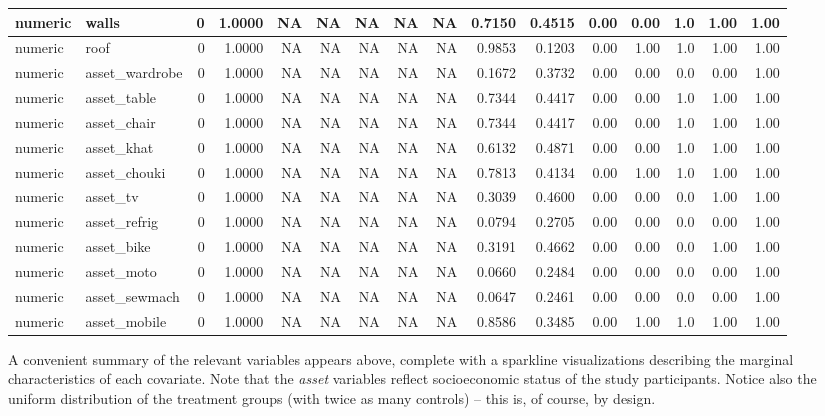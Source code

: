 \documentclass[
  12pt, krantz2,
]{krantz}
\newcommand{\1}{\mathbbm{1}}
\theoremstyle{definition}
\theoremstyle{definition}
\theoremstyle{definition}
\theoremstyle{definition}
\theoremstyle{remark}
\begin{document}
\begin{tabular}{l|l|r|r|r|r|r|r|r|r|r|r|r|r|r|r}
\hline
numeric & walls & 0 & 1.0000 & NA & NA & NA & NA & NA & 0.7150 & 0.4515 & 0.00 & 0.00 & 1.0 & 1.00 & 1.00\\
\hline
numeric & roof & 0 & 1.0000 & NA & NA & NA & NA & NA & 0.9853 & 0.1203 & 0.00 & 1.00 & 1.0 & 1.00 & 1.00\\
\hline
numeric & asset\_wardrobe & 0 & 1.0000 & NA & NA & NA & NA & NA & 0.1672 & 0.3732 & 0.00 & 0.00 & 0.0 & 0.00 & 1.00\\
\hline
numeric & asset\_table & 0 & 1.0000 & NA & NA & NA & NA & NA & 0.7344 & 0.4417 & 0.00 & 0.00 & 1.0 & 1.00 & 1.00\\
\hline
numeric & asset\_chair & 0 & 1.0000 & NA & NA & NA & NA & NA & 0.7344 & 0.4417 & 0.00 & 0.00 & 1.0 & 1.00 & 1.00\\
\hline
numeric & asset\_khat & 0 & 1.0000 & NA & NA & NA & NA & NA & 0.6132 & 0.4871 & 0.00 & 0.00 & 1.0 & 1.00 & 1.00\\
\hline
numeric & asset\_chouki & 0 & 1.0000 & NA & NA & NA & NA & NA & 0.7813 & 0.4134 & 0.00 & 1.00 & 1.0 & 1.00 & 1.00\\
\hline
numeric & asset\_tv & 0 & 1.0000 & NA & NA & NA & NA & NA & 0.3039 & 0.4600 & 0.00 & 0.00 & 0.0 & 1.00 & 1.00\\
\hline
numeric & asset\_refrig & 0 & 1.0000 & NA & NA & NA & NA & NA & 0.0794 & 0.2705 & 0.00 & 0.00 & 0.0 & 0.00 & 1.00\\
\hline
numeric & asset\_bike & 0 & 1.0000 & NA & NA & NA & NA & NA & 0.3191 & 0.4662 & 0.00 & 0.00 & 0.0 & 1.00 & 1.00\\
\hline
numeric & asset\_moto & 0 & 1.0000 & NA & NA & NA & NA & NA & 0.0660 & 0.2484 & 0.00 & 0.00 & 0.0 & 0.00 & 1.00\\
\hline
numeric & asset\_sewmach & 0 & 1.0000 & NA & NA & NA & NA & NA & 0.0647 & 0.2461 & 0.00 & 0.00 & 0.0 & 0.00 & 1.00\\
\hline
numeric & asset\_mobile & 0 & 1.0000 & NA & NA & NA & NA & NA & 0.8586 & 0.3485 & 0.00 & 1.00 & 1.0 & 1.00 & 1.00\\
\hline
\end{tabular}

A convenient summary of the relevant variables appears above, complete with a
sparkline visualizations describing the marginal characteristics of each
covariate. Note that the \emph{asset} variables reflect socioeconomic status of the
study participants. Notice also the uniform distribution of the treatment groups
(with twice as many controls) -- this is, of course, by design.
\end{document}
